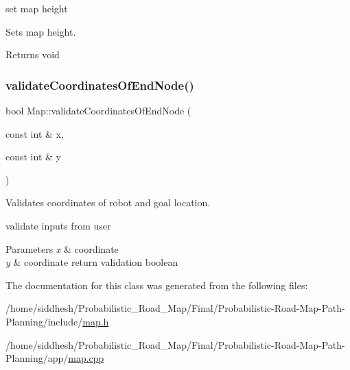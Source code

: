 set map height 

Sets map height.

\begin{DoxyReturn}{Returns}
void 
\end{DoxyReturn}
\mbox{\label{classMap_a6b8d35e143f94303278b4ba3e8e9a254}} 
\subsubsection{\texorpdfstring{validate\+Coordinates\+Of\+End\+Node()}{validateCoordinatesOfEndNode()}}
{\footnotesize\ttfamily bool Map\+::validate\+Coordinates\+Of\+End\+Node (\begin{DoxyParamCaption}\item[{const int \&}]{x,  }\item[{const int \&}]{y }\end{DoxyParamCaption})}



Validates coordinates of robot and goal location. 

validate inputs from user 
\begin{DoxyParams}{Parameters}
{\em x} & coordinate \\
\hline
{\em y} & coordinate return validation boolean \\
\hline
\end{DoxyParams}


The documentation for this class was generated from the following files\+:\begin{DoxyCompactItemize}
\item 
/home/siddhesh/\+Probabilistic\+\_\+\+Road\+\_\+\+Map/\+Final/\+Probabilistic-\/\+Road-\/\+Map-\/\+Path-\/\+Planning/include/\mbox{\hyperlink{map_8h}{map.\+h}}\item 
/home/siddhesh/\+Probabilistic\+\_\+\+Road\+\_\+\+Map/\+Final/\+Probabilistic-\/\+Road-\/\+Map-\/\+Path-\/\+Planning/app/\mbox{\hyperlink{map_8cpp}{map.\+cpp}}\end{DoxyCompactItemize}
